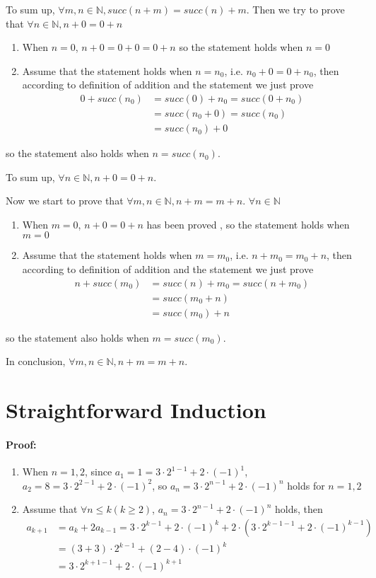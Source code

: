 \documentclass[a4paper,12pt,titlepage]{article}
\begin{document}
To sum up, $\forall m,n\in\mathbb{N}, succ(n+m)=succ(n)+m$. Then we try to prove that  $\forall n\in\mathbb{N}, n+0=0+n$ 
\begin{enumerate}
\item When $n=0$, $n+0=0+0=0+n$
so the statement holds when $n=0$
\item Assume that the statement holds when $n=n_0$, i.e. $n_0+0=0+n_0$, then according to definition of addition and the statement we just prove
\begin{align*}
0+succ(n_0)&=succ(0)+n_0=succ(0+n_0)\\
&=succ(n_0+0)=succ(n_0)\\
&=succ(n_0)+0
\end{align*}
\end{enumerate}

so the statement also holds when $n=succ(n_0)$.

To sum up, $\forall n\in\mathbb{N}, n+0=0+n$. 

Now we start to prove that  $\forall m,n\in\mathbb{N}, n+m=m+n$.  $\forall n\in \mathbb{N}$ 
\begin{enumerate}
\item When $m=0$, $n+0=0+n$ has been proved , so the statement holds when $m=0$
\item Assume that the statement holds when $m=m_0$, i.e. $n+m_0=m_0+n$, then according to definition of addition and the statement we just prove
\begin{align*}
n+succ(m_0)&=succ(n)+m_0=succ(n+m_0)\\
&=succ(m_0+n)\\
&=succ(m_0)+n
\end{align*}
\end{enumerate}

so the statement also holds when $m=succ(m_0)$.

In conclusion, $\forall m,n\in\mathbb{N}, n+m=m+n$.

\section{Straightforward Induction}
\paragraph{Proof:}
\begin{enumerate}
\item When $n=1,2$, since $a_1=1=3\cdot2^{1-1}+2\cdot(-1)^1$, $a_2=8=3\cdot2^{2-1}+2\cdot(-1)^2$, so $a_n=3\cdot2^{n-1}+2\cdot(-1)^n$ holds for $n=1,2$

\item Assume that $\forall n\leqslant k(k\geqslant2)$, $a_n=3\cdot2^{n-1}+2\cdot(-1)^n$ holds, then
\begin{align*}
a_{k+1}&=a_k+2a_{k-1}=3\cdot2^{k-1}+2\cdot(-1)^k+2\cdot(3\cdot2^{k-1-1}+2\cdot(-1)^{k-1})\\
&=(3+3)\cdot2^{k-1}+(2-4)\cdot(-1)^k\\
&=3\cdot2^{k+1-1}+2\cdot(-1)^{k+1}
\end{align*}
\end{enumerate}
\end{document}
